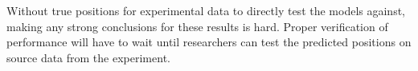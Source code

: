 Without true positions for experimental data to directly test the models against,
making any strong conclusions for these results is hard. Proper verification of performance 
will have to wait until researchers can test the predicted positions on source data from the
experiment.